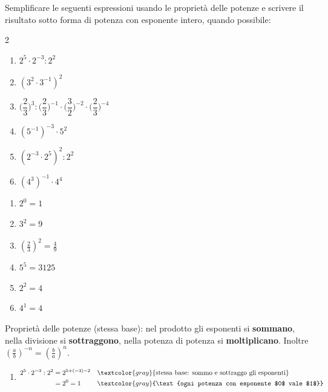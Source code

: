 


\begin{question}[ID=1.1, subtitle={Semplificazione di espressioni con potenze}, tags={potenze, semplificazione}, difficulty=facile]
Semplificare le seguenti espressioni usando le proprietà delle potenze e scrivere il risultato sotto forma di potenza con esponente intero, quando possibile:
\begin{multicols}{2}
\begin{enumerate}[leftmargin=3.2cm]
    \item $2^{5}\cdot 2^{-3} : 2^{2}$
    \item $(3^{2}\cdot 3^{-1})^2$
    \item $\Big(\dfrac{2}{3}\Big)^3 : \Big(\dfrac{2}{3}\Big)^{-1} \cdot\Big(\dfrac{3}{2}\Big)^{-2} \cdot \Big(\dfrac{2}{3}\Big)^{-4}$
    \item $(5^{-1})^{-3}\cdot 5^{2}$
    \item $(2^{-3}\cdot 2^{5})^2 : 2^{2}$
    \item $(4^{3})^{-1}\cdot 4^{4}$
\end{enumerate}
\end{multicols}
\begin{solution}
\begin{enumerate}
    \item $2^0=1$
    \item $3^2=9$
    \item $\left(\tfrac23\right)^2=\tfrac49$
    \item $5^5=3125$
    \item $2^2=4$
    \item $4^1=4$
\end{enumerate}
\end{solution}
\begin{explanation}
Proprietà delle potenze (stessa base): nel prodotto gli esponenti si \textbf{sommano}, nella divisione si \textbf{sottraggono}, nella potenza di potenza si \textbf{moltiplicano}. Inoltre $\left(\tfrac ab\right)^{-n}=\left(\tfrac ba\right)^{n}$.
\begin{enumerate}
    \item \[\begin{aligned}
    2^5\cdot2^{-3}:2^2 &= 2^{5+(-3)-2} && \textcolor{gray}{\text{stessa base: sommo e sottraggo gli esponenti}}\\
    &= 2^0=1 && \textcolor{gray}{\text{ogni potenza con esponente $0$ vale $1$}}

\end{aligned}\]
\end{enumerate}
\end{explanation}
\end{question}
